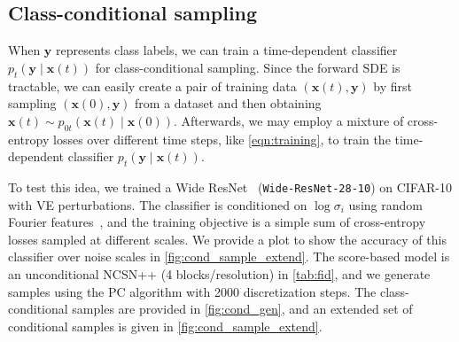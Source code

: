 \documentclass{article} \usepackage{iclr2021_conference,times}
\newcommand{\bfx}{\mathbf{x}}
\newcommand{\bfy}{\mathbf{y}}
\begin{document}
\subsection{Class-conditional sampling}\label{app:class_cond_sampling}
When $\bfy$ represents class labels, we can train a time-dependent classifier $p_t(\bfy \mid \bfx(t))$ for class-conditional sampling. Since the forward SDE is tractable, we can easily create a pair of training data $(\bfx(t), \bfy)$ by first sampling $(\bfx(0), \bfy)$ from a dataset and then obtaining $\bfx(t) \sim p_{0t}(\bfx(t) \mid \bfx(0))$. Afterwards, we may employ a mixture of cross-entropy losses over different time steps, like \cref{eqn:training}, to train the time-dependent classifier $p_t(\bfy \mid \bfx(t))$.

To test this idea, we trained a Wide ResNet~\citep{zagoruyko2016wide} (\verb|Wide-ResNet-28-10|) on CIFAR-10 with VE perturbations. The classifier is conditioned on $\log \sigma_i$ using random Fourier features~\citep{tancik2020fourfeat}, and the training objective is a simple sum of cross-entropy losses sampled at different scales. We provide a plot to show the accuracy of this classifier over noise scales in \cref{fig:cond_sample_extend}. The score-based model is an unconditional NCSN++ (4 blocks/resolution) in \cref{tab:fid}, and we generate samples using the PC algorithm with 2000 discretization steps. The class-conditional samples are provided in \cref{fig:cond_gen}, and an extended set of conditional samples is given in \cref{fig:cond_sample_extend}.
\end{document}
